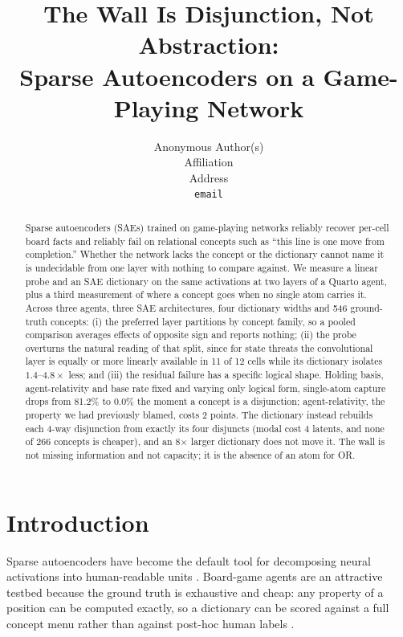 \documentclass{article}
\title{The Wall Is Disjunction, Not Abstraction:\\
       Sparse Autoencoders on a Game-Playing Network}
\author{%
  Anonymous Author(s) \\
  Affiliation \\
  Address \\
  \texttt{email} \\
}
\begin{document}
\maketitle

\begin{abstract}
  Sparse autoencoders (SAEs) trained on game-playing networks reliably
  recover per-cell board facts and reliably fail on relational concepts such
  as ``this line is one move from completion.'' Whether the network lacks the
  concept or the dictionary cannot name it is undecidable from one layer with
  nothing to compare against. We measure a linear probe and an SAE dictionary
  on the same activations at two layers of a Quarto agent, plus a third
  measurement of where a concept goes when no single atom carries it. Across
  three agents, three SAE architectures, four dictionary widths and 546
  ground-truth concepts: (i) the preferred layer partitions by concept
  family, so a pooled comparison averages effects of opposite sign and
  reports nothing; (ii) the probe overturns the natural reading of that
  split, since for state threats the convolutional layer is equally or more
  linearly available in 11 of 12 cells while its dictionary isolates
  $1.4$--$4.8\times$ less; and (iii) the residual failure has a specific
  logical shape. Holding basis, agent-relativity and base rate fixed and
  varying only logical form, single-atom capture drops from 81.2\% to 0.0\%
  the moment a concept is a disjunction; agent-relativity, the property we
  had previously blamed, costs 2 points. The dictionary instead rebuilds each
  4-way disjunction from exactly its four disjuncts (modal cost 4 latents,
  and none of 266 concepts is cheaper), and an 8$\times$ larger dictionary
  does not move it. The wall is not missing information and not capacity; it
  is the absence of an atom for OR.
\end{abstract}

\section{Introduction}
\label{sec:intro}

Sparse autoencoders have become the default tool for decomposing neural
activations into human-readable units \citep{cunningham2023sparse,gao2024scaling}.
Board-game agents are an attractive testbed because the ground truth is
exhaustive and cheap: any property of a position can be computed exactly, so a
dictionary can be scored against a full concept menu rather than against
post-hoc human labels \citep{karvonen2024measuring,li2022emergent,nanda2023emergent}.
\end{document}
